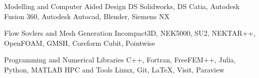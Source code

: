

\begin{cvskills}

  \cvskill
  {Modelling and Computer Aided Design} %
  {DS Solidworks, DS Catia, Autodesk Fusion 360, Autodesk Autocad, Blender, Siemens NX} %

  \cvskill
  {Flow Sovlers and Mesh Generation} %
  {Incompact3D, NEK5000, SU2, NEKTAR++, OpenFOAM, GMSH, Coreform Cubit, Pointwise} %

  \cvskill
  {Programming and Numerical Libraries} %
  {C++, Fortran, FreeFEM++, Julia, Python, MATLAB} %
   \cvskill
  {HPC and Tools} %
  {Linux, Git, LaTeX, Visit, Paraview} %
\end{cvskills}
